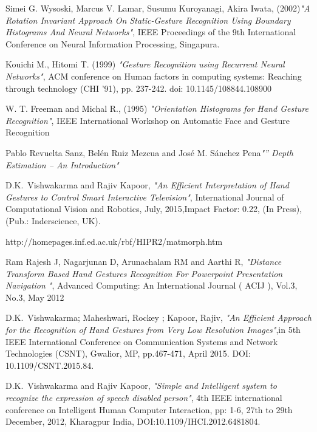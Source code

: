 \documentclass[conference]{IEEEtran}
\begin{document}
{}

\begin{thebibliography}{1}

Simei G. Wysoski, Marcus V. Lamar, Susumu Kuroyanagi, Akira Iwata, (2002)\emph{"A Rotation
Invariant Approach On Static-Gesture Recognition Using Boundary Histograms And Neural Networks"}, IEEE Proceedings of the 9th International Conference on Neural Information
Processing, Singapura.

Kouichi M., Hitomi T. (1999) \emph{"Gesture Recognition using Recurrent Neural Networks"}, ACM
conference on Human factors in computing systems: Reaching through technology (CHI '91), pp.
237-242. doi: 10.1145/108844.108900

W. T. Freeman and Michal R., (1995) \emph{"Orientation Histograms for Hand Gesture Recognition"}, IEEE International Workshop on Automatic Face and Gesture Recognition

Pablo Revuelta Sanz, Belén Ruiz Mezcua and José M. Sánchez Pena\emph{"” Depth Estimation – An Introduction"}

D.K.~Vishwakarma and Rajiv Kapoor, \emph{"An Efficient Interpretation of Hand Gestures to Control Smart Interactive Television"}, International Journal of Computational Vision and Robotics, July, 2015,Impact Factor: 0.22, (In Press), (Pub.: Inderscience, UK).

http://homepages.inf.ed.ac.uk/rbf/HIPR2/matmorph.htm

Ram Rajesh J, Nagarjunan D, Arunachalam RM and Aarthi R, \emph{"Distance Transform Based Hand Gestures Recognition For Powerpoint Presentation Navigation "}, Advanced Computing: An International Journal ( ACIJ ), Vol.3, No.3, May 2012

D.K.~Vishwakarma; Maheshwari, Rockey ; Kapoor, Rajiv,  \emph{"An Efficient Approach for the Recognition of Hand Gestures from Very Low Resolution Images"},in 5th IEEE International Conference on Communication Systems and Network Technologies (CSNT), Gwalior, MP, pp.467-471, April 2015. DOI: 10.1109/CSNT.2015.84.


D.K.~Vishwakarma and Rajiv Kapoor, \emph{"Simple and Intelligent system to recognize the expression of speech disabled person"}, 4th IEEE international conference on Intelligent Human Computer Interaction, pp: 1-6, 27th to 29th December, 2012, Kharagpur India, DOI:10.1109/IHCI.2012.6481804.



\end{thebibliography}
\end{document}
